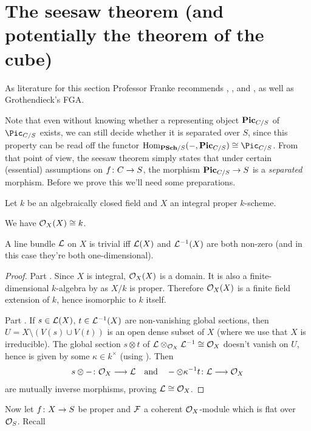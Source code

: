 \documentclass[a4paper,parskip=half,numbers=enddot, DIV=12]{scrreprt}
\begin{document}
\section{The seesaw theorem (and potentially the theorem of the cube)}
As literature for this section Professor Franke recommends \cite{mumford1974abelian}, \cite{cornell1986arithmetic}, and \cite{kleiman}, as well as Grothendieck's FGA.

Note that even without knowing whether a representing object $\mathbf{Pic}_{C/S}$ of $\Pic_{C/S}$ exists, we can still decide whether it is separated over $S$, since this property can be read off the functor $\Hom_{\cat{PSch}/S}(-,\PIC_{C/S})\cong\Pic_{C/S}$. From that point of view, the seesaw theorem simply states that under certain (essential) assumptions on $f\colon C\morphism S$, the morphism $\PIC_{C/S}\morphism S$ is a \emph{separated} morphism. Before we prove this we'll need some preparations.
\begin{prop}
	Let $k$ be an algebraically closed field and $X$ an integral proper $k$-scheme.
	\begin{alphanumerate}
		\item We have $\mathcal{O}_X(X)\cong k$.
		\item A line bundle $\mathcal{L}$ on $X$ is trivial iff $\mathcal{L}(X)$ and $\mathcal{L}^{-1}(X)$ are both non-zero (and in this case they're both one-dimensional).
	\end{alphanumerate}
\end{prop}
\begin{proof}
	Part . Since $X$ is integral, $\mathcal{O}_X(X)$ is a domain. It is also a finite-dimensional $k$-algebra by \cite[Theorem~5]{alggeo2} as $X/k$ is proper. Therefore $\mathcal{O}_X(X)$ is a finite field extension of $k$, hence isomorphic to $k$ itself.
	
	Part . If $s\in\mathcal{L}(X)$, $t\in\mathcal{L}^{-1}(X)$ are non-vanishing global sections, then $U=X\setminus(V(s)\cup V(t))$ is an open dense subset of $X$ (where we use that $X$ is irreducible). The global section $s\otimes t$ of $\mathcal{L}\otimes_{\mathcal{O}_X}\mathcal{L}^{-1}\cong \mathcal{O}_X$ doesn't vanish on $U$, hence is given by some $\kappa\in k^\times$ (using ). Then
	\begin{align*}
		s\otimes-\colon \Oo_X\morphism \Ll\quad\text{and}\quad-\otimes\kappa^{-1}t\colon \Ll\morphism\Oo_X
	\end{align*}
	are mutually inverse morphisms, proving $\mathcal{L}\cong \mathcal{O}_X$.
\end{proof}
Now let $f\colon X\morphism S$ be proper and $\mathcal{F}$ a coherent $\mathcal{O}_X$-module which is flat over $\mathcal{O}_S$. Recall
\end{document}
